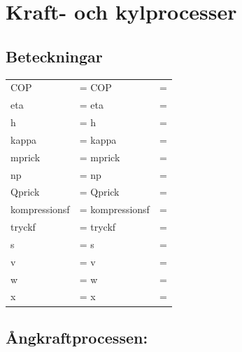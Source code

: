 \chapter{Kraft- och kylprocesser}
\section*{Beteckningar}
	\begin{tabularx}{\linewidth} { l
	>{\raggedright\arraybackslash\hsize=1.5\hsize\linewidth=\hsize}X
	>{\raggedright\arraybackslash\hsize=0.5\hsize\linewidth=\hsize}X}
	\acrshort{COP} & \acrlong{COP}\\
	\acrshort{eta} & \acrlong{eta}\\
	\acrshort{h} & \acrlong{h}\\
	\acrshort{kappa} & \acrlong{kappa}\\
	\acrshort{mprick} & \acrlong{mprick}\\
	\acrshort{np} & \acrlong{np}\\
	\acrshort{Qprick} & \acrlong{Qprick}\\
	\acrshort{kompressionsf} & \acrlong{kompressionsf}\\
	\acrshort{tryckf} & \acrlong{tryckf}\\
	\acrshort{s} & \acrlong{s}\\
	\acrshort{v} & \acrlong{v}\\
	\acrshort{w} & \acrlong{w}\\
	\acrshort{x} & \acrlong{x}
\end{tabularx}
\section*{Ångkraftprocessen:}
